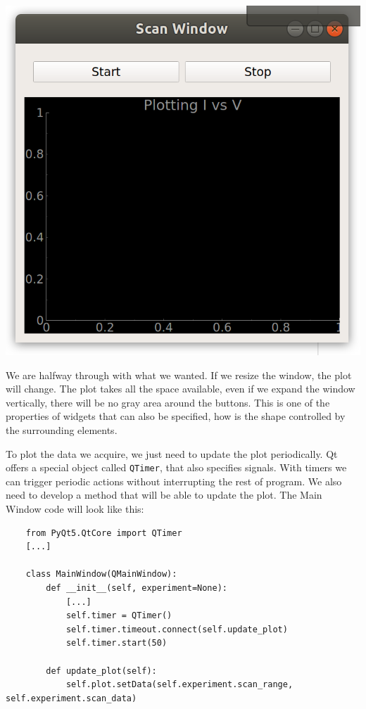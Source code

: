 \begin{center}
    \includegraphics[width=.4\textwidth]{images/Chapter_08/07_window_empty_plot.png}
\end{center}

We are halfway through with what we wanted. If we resize the window, the plot will change. The plot takes all the space available, even if we expand the window vertically, there will be no gray area around the buttons. This is one of the properties of widgets that can also be specified, how is the shape controlled by the surrounding elements.


To plot the data we acquire, we just need to update the plot periodically. Qt offers a special object called \texttt{QTimer}, that also specifies signals. With timers we can trigger periodic actions without interrupting the rest of program. We also need to develop a method that will be able to update the plot. The Main Window code will look like this:

\begin{verbatim}
    from PyQt5.QtCore import QTimer
    [...]

    class MainWindow(QMainWindow):
        def __init__(self, experiment=None):
            [...]
            self.timer = QTimer()
            self.timer.timeout.connect(self.update_plot)
            self.timer.start(50)

        def update_plot(self):
            self.plot.setData(self.experiment.scan_range, self.experiment.scan_data)
\end{verbatim}

